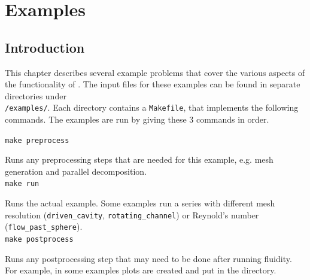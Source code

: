 \chapter{Examples}
\label{chap:examples}
\section{Introduction}
\label{sect:examples_introduction}
This chapter describes several example problems that cover the various aspects of the functionality
of \fluidity. The input files for these examples can be found in separate directories
under \\ \texttt{\fluiditysourcepath/examples/}. Each directory contains a \texttt{Makefile},
that implements the following commands. The examples are run by giving these 3 commands in order.

\hspace{0.05\textwidth}
\begin{minipage}{0.9\textwidth}
\texttt{make preprocess}

Runs any preprocessing steps that are needed for this example, e.g. mesh generation and
parallel decomposition.
\ \\

\texttt{make run}

Runs the actual example. Some examples run a series with different mesh resolution
(\texttt{driven\_cavity}, \texttt{rotating\_channel}) or Reynold's number
(\texttt{flow\_past\_sphere}).
\ \\

\texttt{make postprocess}

Runs any postprocessing step that may need to be done after running fluidity. For example, in some
examples plots are created and put in the directory.
\end{minipage}

